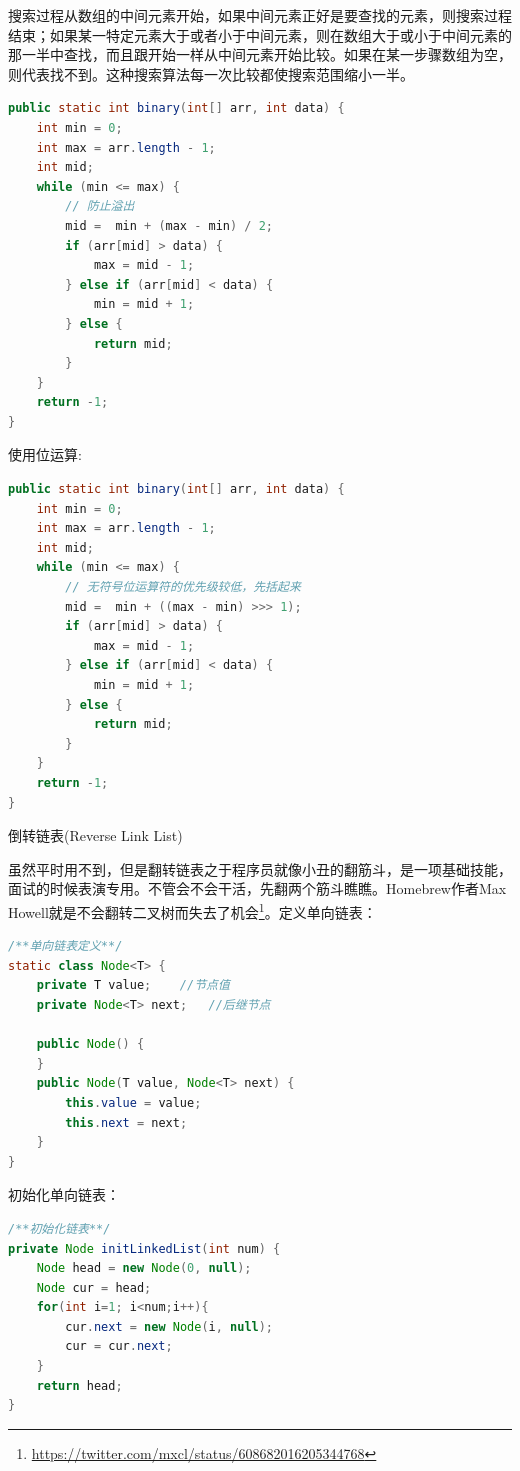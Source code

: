 \documentclass[8pt]{book}
\makeatletter
\numberwithin{dummy}{section}
\theoremstyle{ocrenumbox}
\theoremstyle{blacknumex}
\theoremstyle{blacknumbox}
\theoremstyle{ocrenum}
\renewcommand{\subsection}{\@startsection {subsection}{2}{\z@}
	{-3ex \@plus -0.1ex \@minus -.4ex}
	{0.5ex \@plus.2ex }
	{\normalfont\sffamily\bfseries}}
\makeatother
\begin{document}
搜索过程从数组的中间元素开始，如果中间元素正好是要查找的元素，则搜索过程结束；如果某一特定元素大于或者小于中间元素，则在数组大于或小于中间元素的那一半中查找，而且跟开始一样从中间元素开始比较。如果在某一步骤数组为空，则代表找不到。这种搜索算法每一次比较都使搜索范围缩小一半。

\begin{lstlisting}[language=Java]
public static int binary(int[] arr, int data) {
    int min = 0;
    int max = arr.length - 1;
    int mid;
    while (min <= max) {
        // 防止溢出
        mid =  min + (max - min) / 2;
        if (arr[mid] > data) {
            max = mid - 1;
        } else if (arr[mid] < data) {
            min = mid + 1;
        } else {
            return mid;
        }
    }
    return -1;
}
\end{lstlisting}

使用位运算:

\begin{lstlisting}[language=Java]
public static int binary(int[] arr, int data) {
    int min = 0;
    int max = arr.length - 1;
    int mid;
    while (min <= max) {
        // 无符号位运算符的优先级较低，先括起来
        mid =  min + ((max - min) >>> 1);
        if (arr[mid] > data) {
            max = mid - 1;
        } else if (arr[mid] < data) {
            min = mid + 1;
        } else {
            return mid;
        }
    }
    return -1;
}
\end{lstlisting}

\subsection{倒转链表(Reverse Link List)}

虽然平时用不到，但是翻转链表之于程序员就像小丑的翻筋斗，是一项基础技能，面试的时候表演专用。不管会不会干活，先翻两个筋斗瞧瞧。Homebrew作者Max Howell就是不会翻转二叉树而失去了机会\footnote{\url{https://twitter.com/mxcl/status/608682016205344768}}。定义单向链表：


\begin{lstlisting}[language=Java]
/**单向链表定义**/
static class Node<T> {
    private T value;    //节点值
    private Node<T> next;   //后继节点

    public Node() {
    }
    public Node(T value, Node<T> next) {
        this.value = value;
        this.next = next;
    }
}
\end{lstlisting}

初始化单向链表：

\begin{lstlisting}[language=Java]
/**初始化链表**/
private Node initLinkedList(int num) {
    Node head = new Node(0, null);
    Node cur = head;
    for(int i=1; i<num;i++){
        cur.next = new Node(i, null);
        cur = cur.next;
    }
    return head;
}
\end{lstlisting}
\end{document}

